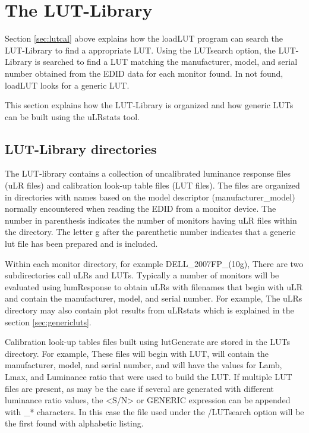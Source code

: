%

\section{The LUT-Library}
\label{sec:lutlibrary}

Section \ref{sec:lutcal} above explains how the loadLUT program can search the LUT-Library to find a appropriate LUT. Using the LUTsearch option, the LUT-Library is searched to find a LUT matching the manufacturer, model, and serial number obtained from the EDID data for each monitor found. In not found, loadLUT looks for a generic LUT. 

This section explains how the LUT-Library is organized and how generic LUTs can be built using the uLRstats tool.

\subsection{LUT-Library directories}

The LUT-library contains a collection of uncalibrated luminance response files (uLR files) and calibration look-up table files (LUT files). The files are organized in directories with names based on the model descriptor (manufacturer\_model) normally encountered when reading the EDID from a monitor device. The number in parenthesis indicates the number of monitors having uLR files within the directory. The letter g after the parenthetic number indicates that a generic lut file has been prepared and is included. 

Within each monitor directory, for example \textnormal{DELL\_2007FP\_(10g)}, There are two subdirectories call uLRs and LUTs. Typically a number of monitors will be evaluated using lumResponse to obtain uLRs with filenames that begin with uLR and contain the manufacturer, model, and serial number. For example,
The uLRs directory may also contain plot results from uLRstats which is explained in the section \ref{sec:genericluts}. 

Calibration look-up tables files built using lutGenerate are stored in the LUTs directory. For example,
These files will begin with LUT, will contain the manufacturer, model, and serial number, and will have the values for Lamb, Lmax, and Luminance ratio that were used to build the LUT. If multiple LUT files are present, as may be the case if several are generated with different luminance ratio values, the <S/N> or GENERIC expression can be appended with \_* characters. In this case the file used under the /LUTsearch option will be the first found with alphabetic listing. 

